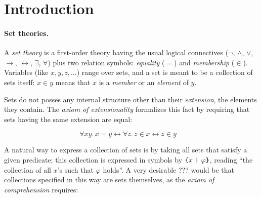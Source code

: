 \documentclass[sigplan,10pt,anonymous,review]{acmart}\settopmatter{printfolios=true,printccs=false,printacmref=false}
\begin{document}

\maketitle

\section{Introduction}


\paragraph{Set theories.}
A \emph{set theory} is a first-order theory having the usual logical connectives ($\neg$, $\land$, $\lor$, $\to$, $\leftrightarrow$, $\exists$, $\forall$) plus two relation symbols: \emph{equality} ($=$) and \emph{membership} ($\in$). Variables (like $x,y,z,\ldots$) range over sets, and a set is meant to be a collection of sets itself: $x \in y$ means that $x$ is a \emph{member} or an \emph{element} of $y$.



Sets do not posses any internal structure other than their \emph{extension}, \ie{} the elements they contain. The \emph{axiom of extensionality} formalizes this fact by requiring that sets having the same extension are equal:

\[\forall x y.\, x = y \leftrightarrow \forall z. \, z \in x \leftrightarrow z \in y \quad \tag{\SetExt} \]

A natural way to express a collection of sets is by taking all sets that satisfy a given predicate; this collection is expressed in symbols by $\text{\texttt{\{}} x ~\text{\texttt{|}}~ \varphi \text{\texttt{\}}}$, reading ``the collection of all $x$'s such that $\varphi$ holds''.  A very desirable ??? would be that collections specified in this way are sets themselves, as the \emph{axiom of comprehension} requires:
\end{document}
